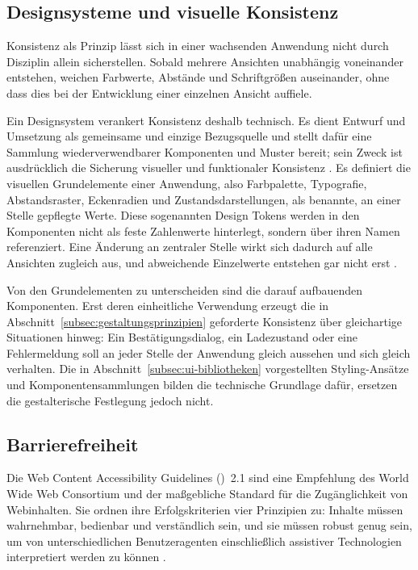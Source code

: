 \subsection{Designsysteme und visuelle Konsistenz}
\label{subsec:designsysteme}
 
Konsistenz als Prinzip lässt sich in einer wachsenden Anwendung
nicht durch Disziplin allein sicherstellen. Sobald mehrere
Ansichten unabhängig voneinander entstehen, weichen Farbwerte,
Abstände und Schriftgrößen auseinander, ohne dass dies bei der
Entwicklung einer einzelnen Ansicht auffiele.
 
Ein Designsystem verankert Konsistenz deshalb technisch. Es dient
Entwurf und Umsetzung als gemeinsame und einzige Bezugsquelle und
stellt dafür eine Sammlung wiederverwendbarer Komponenten und Muster
bereit; sein Zweck ist ausdrücklich die Sicherung visueller und
funktionaler Konsistenz \cite{shah_design_system_2023}. Es definiert die visuellen
Grundelemente einer Anwendung, also Farbpalette, Typografie,
Abstandsraster, Eckenradien und Zustandsdarstellungen, als benannte,
an einer Stelle gepflegte Werte. Diese sogenannten Design Tokens
werden in den Komponenten nicht als feste Zahlenwerte hinterlegt,
sondern über ihren Namen referenziert. Eine Änderung an zentraler
Stelle wirkt sich dadurch auf alle Ansichten zugleich aus, und
abweichende Einzelwerte entstehen gar nicht erst
\cite{dtcg_format_2025}.
 
Von den Grundelementen zu unterscheiden sind die darauf
aufbauenden Komponenten. Erst deren einheitliche Verwendung
erzeugt die in Abschnitt~\ref{subsec:gestaltungsprinzipien}
geforderte Konsistenz über gleichartige Situationen hinweg: Ein
Bestätigungsdialog, ein Ladezustand oder eine Fehlermeldung soll
an jeder Stelle der Anwendung gleich aussehen und sich gleich
verhalten. Die in Abschnitt~\ref{subsec:ui-bibliotheken}
vorgestellten Styling-Ansätze und Komponentensammlungen bilden die
technische Grundlage dafür, ersetzen die gestalterische Festlegung
jedoch nicht.
 
 
\subsection{Barrierefreiheit}
\label{subsec:barrierefreiheit}
 
Die Web Content Accessibility Guidelines ()~2.1 sind
eine Empfehlung des World Wide Web Consortium und der
maßgebliche Standard für die Zugänglichkeit von Webinhalten. Sie
ordnen ihre Erfolgskriterien vier Prinzipien zu: Inhalte müssen
wahrnehmbar, bedienbar und verständlich sein, und sie müssen
robust genug sein, um von unterschiedlichen Benutzeragenten
einschließlich assistiver Technologien interpretiert werden zu
können \cite{wcag21}.
 
